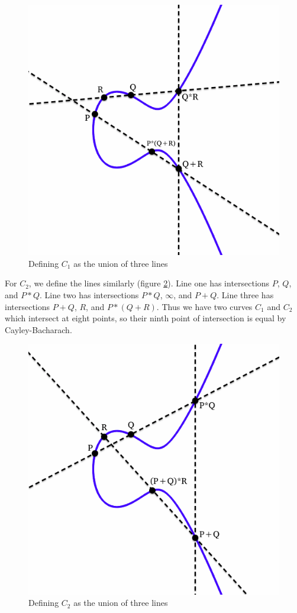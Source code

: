 \documentclass{article}
\begin{document}
\begin{figure}[h]
\centering
\includegraphics[width=0.8\linewidth]{images/ec5-assoc-1.png}
\caption{Defining $C_1$ as the union of three lines}
\label{fig:ec-assoc-1}
\end{figure}

For $C_2$, we define the lines similarly (figure \ref{fig:ec-assoc-2}).
Line one has intersections $P$, $Q$, and $P*Q$.
Line two has intersections $P*Q$, $\infty$, and $P+Q$.
Line three has intersections $P+Q$, $R$, and $P*(Q+R)$.
Thus we have two curves $C_1$ and $C_2$ which intersect at eight points, so their ninth point of intersection is equal by Cayley-Bacharach.
\cite[\S 1.2]{rational-points}

\begin{figure}[h]
\centering
\includegraphics[width=0.8\linewidth]{images/ec5-assoc-2.png}
\caption{Defining $C_2$ as the union of three lines}
\label{fig:ec-assoc-2}
\end{figure}
\end{document}
